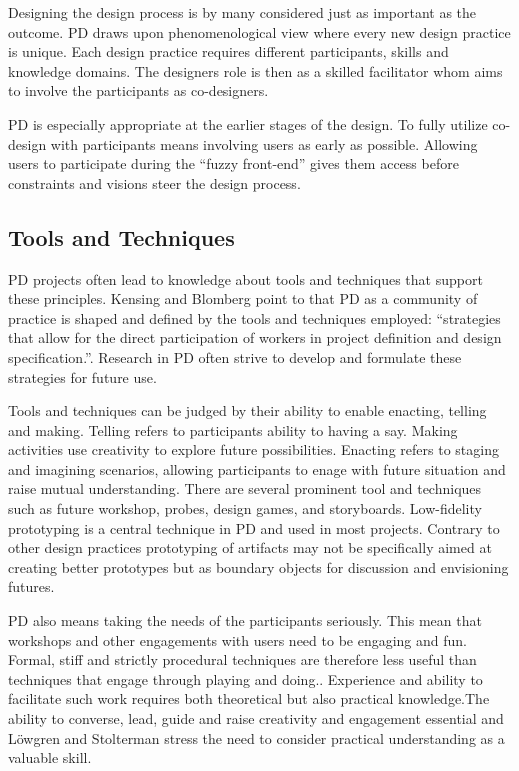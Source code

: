 \documentclass[UKenglish]{uiophd}
\begin{document}
		Designing the design process is by many considered just as important as the outcome. PD draws upon phenomenological view where every new design practice is unique. Each design practice requires different participants, skills and knowledge domains. The designers role is then as a skilled facilitator whom aims to involve the participants as co-designers.   
		  
		PD is especially appropriate at the earlier stages of the design. To fully utilize co-design with participants means involving users as early as possible.  Allowing users to participate during the ``fuzzy front-end''\cite[p.~6]{Sanders2008CoCreation} gives them access before constraints and visions steer the design process\cite{Loewgren2004Thoughtful}. 

	\subsection{Tools and Techniques}
		PD projects often lead to knowledge about tools and techniques that support these principles. Kensing and Blomberg point to that PD as a community of practice is shaped and defined by the tools and techniques employed: ``strategies that allow for the direct participation of workers in project definition and design specification.''\cite[p.~181]{Kensing1998Participatory}. Research in PD often strive to develop and formulate these strategies for future use. 

		Tools and techniques can be judged by their ability to enable enacting, telling and making. Telling refers to participants ability to having a say. Making activities use creativity to explore future possibilities. Enacting refers to staging and imagining scenarios, allowing participants to enage with future situation and raise mutual understanding\cite[p.149]{Simonsen2012Routledge}. There are several prominent tool and techniques such as future workshop, probes, design games, and storyboards.
		Low-fidelity prototyping is a central technique in PD and used in most projects. Contrary to other design practices prototyping of artifacts may not be specifically aimed at creating better prototypes but as boundary objects for discussion and envisioning futures.

		PD also means taking the needs of the participants seriously. This mean that workshops and other engagements with users need to be engaging and fun. Formal, stiff and strictly procedural techniques are therefore less useful than techniques that engage through playing and doing.\cite[p.153]{Loewgren2004Thoughtful}. Experience and ability to facilitate such work requires both theoretical but also practical knowledge.The ability to converse, lead, guide and raise creativity and engagement essential and Löwgren and Stolterman stress the need to consider practical understanding as a valuable skill\cite[p.152]{Loewgren2004Thoughtful}. 
\end{document}

